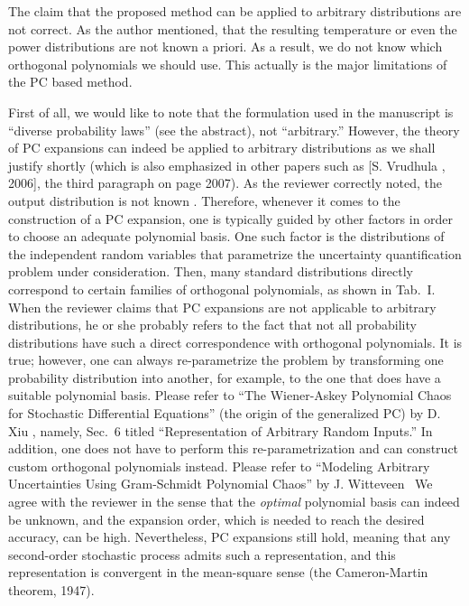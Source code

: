 \begin{reviewer}
The claim that the proposed method can be applied to arbitrary distributions are not correct. As the author mentioned, that the resulting temperature or even the power distributions are not known a priori. As a result, we do not know which orthogonal polynomials we should use. This actually is the major limitations of the PC based method.
\end{reviewer}
\begin{authors}
First of all, we would like to note that the formulation used in the manuscript is ``diverse probability laws'' (see the abstract), not ``arbitrary.''
However, the theory of PC expansions can indeed be applied to arbitrary distributions as we shall justify shortly (which is also emphasized in other papers such as [S. Vrudhula \etal, 2006], the third paragraph on page 2007).
As the reviewer correctly noted, the output distribution is not known \apriori.
Therefore, whenever it comes to the construction of a PC expansion, one is typically guided by other factors in order to choose an adequate polynomial basis.
One such factor is the distributions of the independent random variables that parametrize the uncertainty quantification problem under consideration.
Then, many standard distributions directly correspond to certain families of orthogonal polynomials, as shown in Tab.~I.
When the reviewer claims that PC expansions are not applicable to arbitrary distributions, he or she probably refers to the fact that not all probability distributions have such a direct correspondence with orthogonal polynomials.
It is true; however, one can always re-parametrize the problem by transforming one probability distribution into another, for example, to the one that does have a suitable polynomial basis.
Please refer to ``The Wiener-Askey Polynomial Chaos for Stochastic Differential Equations'' (the origin of the generalized PC) by D. Xiu \etal, namely, Sec.~6 titled ``Representation of Arbitrary Random Inputs.''
In addition, one does not have to perform this re-parametrization and can construct custom orthogonal polynomials instead.
Please refer to ``Modeling Arbitrary Uncertainties Using Gram-Schmidt Polynomial Chaos'' by J. Witteveen \etal\ We agree with the reviewer in the sense that the \emph{optimal} polynomial basis can indeed be unknown, and the expansion order, which is needed to reach the desired accuracy, can be high.
Nevertheless, PC expansions still hold, meaning that any second-order stochastic process admits such a representation, and this representation is convergent in the mean-square sense (the Cameron-Martin theorem, 1947).
\end{authors}

